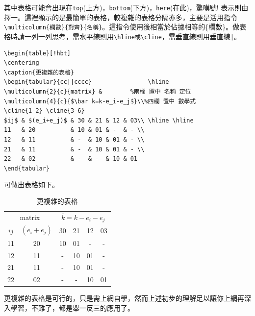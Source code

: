 \label{bookstruc1} 
其中表格可能會出現在{\tt top}(上方)，{\tt bottom}(下方)，{\tt here}(在此)，驚嘆號$!$ 表示則由擇一。這裡顯示的是最簡單的表格，較複雜的表格分隔亦多，主要是活用指令\verb|\multicolumn{欄數}{對齊}{名稱}|。這指令使用後相當於佔據相等的\{欄數\}。做表格時請一列一列思考，需水平線則用\verb|\hline或\cline|，需垂直線則用垂直線\verb+|+。

\begin{Verbatim}[frame=single,firstline=1,label=A bit complicated tabular]
\begin{table}[!hbt]
\centering
\caption{更複雜的表格}
\begin{tabular}{cc||cccc}                \hline
\multicolumn{2}{c}{matrix} &        %兩欄 置中 名稱 定位
\multicolumn{4}{c}{$\bar k=k-e_i-e_j$}\\%四欄 置中 數學式
\cline{1-2} \cline{3-6}
$ij$ & $(e_i+e_j)$ & 30 & 21 & 12 & 03\\ \hline \hline
11   & 20          & 10 & 01 & -  & - \\ 
12   & 11          & -  & 10 & 01 & - \\  
21   & 11          & -  & 10 & 01 & - \\  
22   & 02          & -  & -  & 10 & 01    
\end{tabular}
\end{Verbatim}
可做出表格如下。
\begin{table}[!hbt]
\centering
\caption{更複雜的表格}
\begin{tabular}{cc||cccc}                \hline
\multicolumn{2}{c}{matrix} & 
\multicolumn{4}{c}{$\bar k=k-e_i-e_j$}\\ 
\cline{1-2} \cline{3-6}
$ij$ & $(e_i+e_j)$ & 30 & 21 & 12 & 03\\ \hline \hline
11   & 20          & 10 & 01 & -  & - \\ 
12   & 11          & -  & 10 & 01 & - \\  
21   & 11          & -  & 10 & 01 & - \\  
22   & 02          & -  & -  & 10 & 01  
\end{tabular}
\end{table}
更複雜的表格是可行的，只是需上網自學，然而上述初步的理解足以讓你上網再深入學習，不難了，都是舉一反三的應用了。



